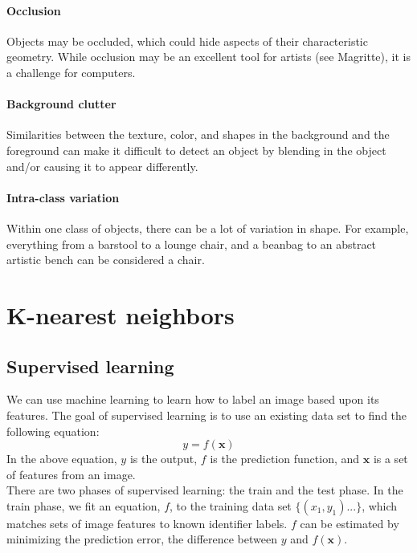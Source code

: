 \documentclass{article}
\begin{document}
\paragraph{Occlusion} Objects may be occluded, which could hide aspects of their characteristic geometry. While occlusion may be an excellent tool for artists (see Magritte), it is a challenge for computers.

\paragraph{Background clutter} Similarities between the texture, color, and shapes in the background and the foreground can make it difficult to detect an object by blending in the object and/or causing it to appear differently.

\paragraph{Intra-class variation} Within one class of objects, there can be a lot of variation in shape. For example, everything from a barstool to a lounge chair, and a beanbag to an abstract artistic bench can be considered a chair. 

\section{K-nearest neighbors}

\subsection{Supervised learning}
We can use machine learning to learn how to label an image based upon its features. The goal of supervised learning is to use an existing data set to find the following equation:
\begin{equation}
y=f(\mathbf{x})
\end{equation}
In the above equation, $y$ is the output, $f$ is the prediction function, and $\mathbf{x}$ is a set of features from an image.\\

There are two phases of supervised learning: the train and the test phase. In the train phase, we fit an equation, $f$, to the training data set $\{(x_1, y_1) ... \}$, which matches sets of image features to known identifier labels. $f$ can be estimated by minimizing the prediction error, the difference between $y$ and $f(\mathbf{x})$. \\
\end{document}
